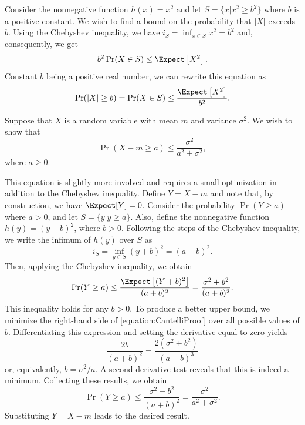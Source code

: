 \begin{example}
Consider the nonnegative function $h(x) = x^2$ and let $S = \{ x | x^2 \geq b^2 \}$ where $b$ is a positive constant.
We wish to find a bound on the probability that $|X|$ exceeds $b$.
Using the Chebyshev inequality, we have $i_S = \inf_{x \in S} x^2 = b^2$ and, consequently, we get
\begin{equation*}
b^2 \Pr (X \in S) \leq \Expect \left[ X^2 \right] .
\end{equation*}
Constant $b$ being a positive real number, we can rewrite this equation as
\begin{equation*}
\Pr (|X| \geq b) = \Pr (X \in S) \leq \frac{\Expect \left[ X^2 \right]}{b^2} .
\end{equation*}
\end{example}

\begin{example}
Suppose that $X$ is a random variable with mean $m$ and variance $\sigma^2$.
We wish to show that
\begin{equation*}
\Pr (X-m \geq a) \leq \frac{\sigma^2}{a^2 + \sigma^2},
\end{equation*}
where $a \geq 0$.

This equation is slightly more involved and requires a small optimization in addition to the Chebyshev inequality.
Define $Y = X - m$ and note that, by construction, we have $\Expect [Y] = 0$.
Consider the probability $\Pr (Y \geq a)$ where $a > 0$, and let $S = \{ y | y \geq a \}$.
Also, define the nonnegative function $h(y) = (y + b)^2$, where $b > 0$.
Following the steps of the Chebyshev inequality, we write the infimum of $h(y)$ over $S$ as
\begin{equation*}
i_S = \inf_{y \in S} (y+b)^2 = (a+b)^2 .
\end{equation*}
Then, applying the Chebyshev inequality, we obtain
\begin{equation} \label{equation:CantelliProof}
\Pr (Y \geq a) \leq \frac{ \Expect \left[ (Y+b)^2 \right] }{(a+b)^2}
= \frac{\sigma^2 + b^2}{(a+b)^2} .
\end{equation}
This inequality holds for any $b > 0$.
To produce a better upper bound, we minimize the right-hand side of \eqref{equation:CantelliProof} over all possible values of $b$.
Differentiating this expression and setting the derivative equal to zero yields
\begin{equation*}
\frac{2b}{(a+b)^2} = \frac{2 \left(\sigma^2 + b^2 \right)}{(a+b)^3}
\end{equation*}
or, equivalently, $b = \sigma^2 / a$.
A second derivative test reveals that this is indeed a minimum.
Collecting these results, we obtain
\begin{equation*}
\Pr (Y \geq a) \leq \frac{\sigma^2 + b^2}{(a+b)^2}
= \frac{\sigma^2}{a^2 + \sigma^2} .
\end{equation*}
Substituting $Y=X-m$ leads to the desired result.
\end{example}

